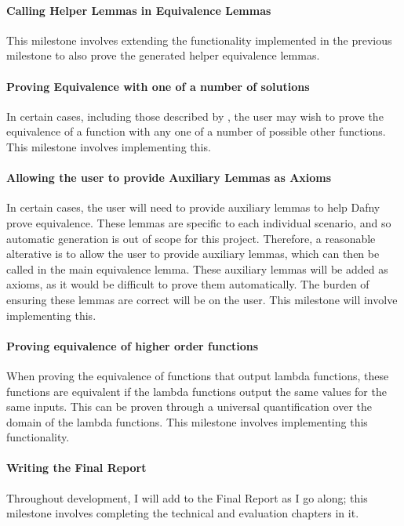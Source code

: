\paragraph{Calling Helper Lemmas in Equivalence Lemmas}\label{para:calling-lemmas-helper} This milestone involves extending the functionality implemented in the previous milestone to also prove the generated helper equivalence lemmas.

\paragraph{Proving Equivalence with one of a number of solutions}\label{para:multiple-solutions} In certain cases, including those described by \textcite{milovancevicProvingDisprovingEquivalence2023}, the user may wish to prove the equivalence of a function with any one of a number of possible other functions. This milestone involves implementing this. 

\paragraph{Allowing the user to provide Auxiliary Lemmas as Axioms}\label{para:auxiliary-axioms} In certain cases, the user will need to provide auxiliary lemmas to help Dafny prove equivalence. These lemmas are specific to each individual scenario, and so automatic generation is out of scope for this project. Therefore, a reasonable alterative is to allow the user to provide auxiliary lemmas, which can then be called in the main equivalence lemma. These auxiliary lemmas will be added as axioms, as it would be difficult to prove them automatically. The burden of ensuring these lemmas are correct will be on the user. This milestone will involve implementing this.

\paragraph{Proving equivalence of higher order functions}\label{para:higher-order} When proving the equivalence of functions that output lambda functions, these functions are equivalent if the lambda functions output the same values for the same inputs. This can be proven through a universal quantification over the domain of the lambda functions. This milestone involves implementing this functionality. 

\paragraph{Writing the Final Report}\label{para:final-report-project} Throughout development, I will add to the Final Report as I go along; this milestone involves completing the technical and evaluation chapters in it.

